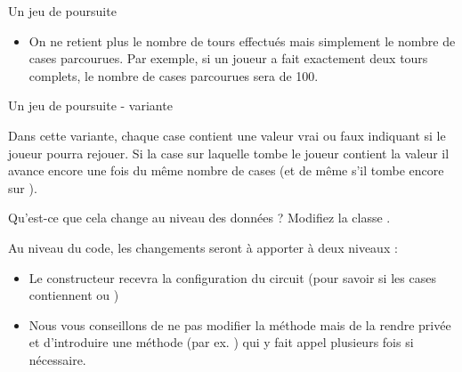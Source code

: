\begin{Exercice}{Un jeu de poursuite}
\begin{enumerate}
		\begin{itemize}
		\item
			On ne retient plus le nombre de tours effectués
			mais simplement le nombre de cases parcourues.
			Par exemple, si un joueur a fait exactement deux tours complets,
			le nombre de cases parcourues sera de 100.
			\begin{LDA}
				\EndStruct
			\end{LDA}
		\end{itemize}
	\end{enumerate}
	
\end{Exercice}

\begin{Exercice}{Un jeu de poursuite - variante}

	Dans cette variante,
	chaque case contient une valeur vrai ou faux
	indiquant si le joueur pourra rejouer.
	Si la case sur laquelle tombe le joueur contient la valeur
	 il avance encore une fois du même nombre de cases 
	(et de même s’il tombe encore sur ).
	
	Qu'est-ce que cela change au niveau des données ?
	Modifiez la classe .

	Au niveau du code,
	les changements seront à apporter à deux niveaux :
	\begin{itemize}
	\item 
		Le constructeur recevra la configuration du circuit 
		(pour savoir si les cases contiennent  ou )
	\item
		Nous vous conseillons de ne pas modifier la méthode  
		mais de la rendre privée 
		et d'introduire une méthode (par ex. ) 
		qui y fait appel plusieurs fois si nécessaire.
	\end{itemize}
\end{Exercice}

